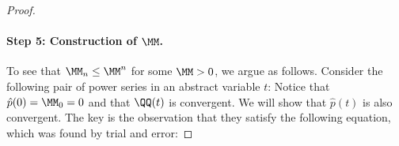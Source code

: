 \documentclass[11pt]{article}
\begin{document}
\begin{proof}
\paragraph*{Step 5: Construction of $\MM$.}
To see that $\MM_n \leq \MM^n$ for some $\MM > 0$, we argue as follows.
Consider the following pair of power series in an abstract variable $t$:
Notice that $\hat{p} (0) = \MM_0 = 0$ and that $\QQ (t)$ is convergent.
We will show that $\hat{p} (t)$ is also convergent.
The key is the observation that they satisfy the following equation, which was found by trial and error:


\end{proof}
\end{document}
